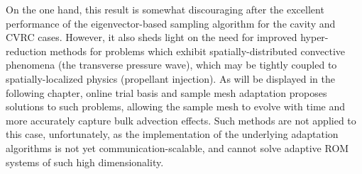 On the one hand, this result is somewhat discouraging after the excellent performance of the eigenvector-based sampling algorithm for the cavity and CVRC cases. However, it also sheds light on the need for improved hyper-reduction methods for problems which exhibit spatially-distributed convective phenomena (the transverse pressure wave), which may be tightly coupled to spatially-localized physics (propellant injection). As will be displayed in the following chapter, online trial basis and sample mesh adaptation proposes solutions to such problems, allowing the sample mesh to evolve with time and more accurately capture bulk advection effects. Such methods are not applied to this case, unfortunately, as the implementation of the underlying adaptation algorithms is not yet communication-scalable, and cannot solve adaptive ROM systems of such high dimensionality.

